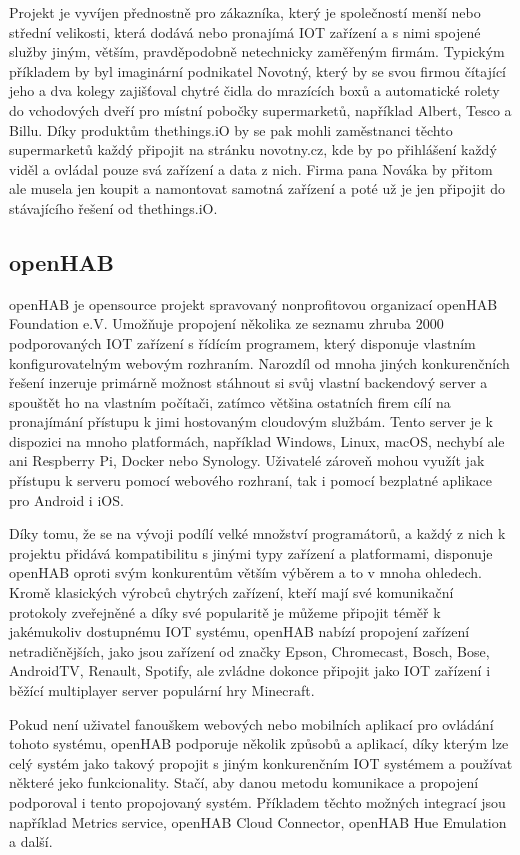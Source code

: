 Projekt je vyvíjen přednostně pro zákazníka, který je společností menší nebo střední velikosti, která dodává nebo pronajímá IOT zařízení a s nimi spojené služby jiným, větším, pravděpodobně netechnicky zaměřeným firmám. Typickým příkladem by byl imaginární podnikatel Novotný, který by se svou firmou čítající jeho a dva kolegy zajišťoval chytré čidla do mrazících boxů a automatické rolety do vchodových dveří pro místní pobočky supermarketů, například Albert, Tesco a Billu. Díky produktům thethings.iO by se pak mohli zaměstnanci těchto supermarketů každý připojit na stránku novotny.cz, kde by po přihlášení každý viděl a ovládal pouze svá zařízení a data z nich. Firma pana Nováka by přitom ale musela jen koupit a namontovat samotná zařízení a poté už je jen připojit do stávajícího řešení od thethings.iO. 

\subsection{openHAB}

openHAB je opensource projekt spravovaný nonprofitovou organizací openHAB Foundation e.V. Umožňuje propojení několika ze seznamu zhruba 2000 podporovaných IOT zařízení s řídícím programem, který disponuje vlastním konfigurovatelným webovým rozhraním. Narozdíl od mnoha jiných konkurenčních řešení inzeruje primárně možnost stáhnout si svůj vlastní backendový server a spouštět ho na vlastním počítači, zatímco většina ostatních firem cílí na pronajímání přístupu k jimi hostovaným cloudovým službám. Tento server je k dispozici na mnoho platformách, například Windows, Linux, macOS, nechybí ale ani Respberry Pi, Docker nebo Synology. Uživatelé zároveň mohou využít jak přístupu k serveru pomocí webového rozhraní, tak i pomocí bezplatné aplikace pro Android i iOS. 

Díky tomu, že se na vývoji podílí velké množství programátorů, a každý z nich k projektu přidává kompatibilitu s jinými typy zařízení a platformami, disponuje openHAB oproti svým konkurentům větším výběrem a to v mnoha ohledech. Kromě klasických výrobců chytrých zařízení, kteří mají své komunikační protokoly zveřejněné a díky své popularitě je můžeme připojit téměř k jakémukoliv dostupnému IOT systému, openHAB nabízí propojení zařízení netradičnějších, jako jsou zařízení od značky Epson, Chromecast, Bosch, Bose, AndroidTV, Renault, Spotify, ale zvládne dokonce připojit jako IOT zařízení i běžící multiplayer server populární hry Minecraft.

Pokud není uživatel fanouškem webových nebo mobilních aplikací pro ovládání tohoto systému, openHAB podporuje několik způsobů a aplikací, díky kterým lze celý systém jako takový propojit s jiným konkurenčním IOT systémem a používat některé jeko funkcionality. Stačí, aby danou metodu komunikace a propojení podporoval i tento propojovaný systém. Příkladem těchto možných integrací jsou například Metrics service, openHAB Cloud Connector, openHAB Hue Emulation a další.

